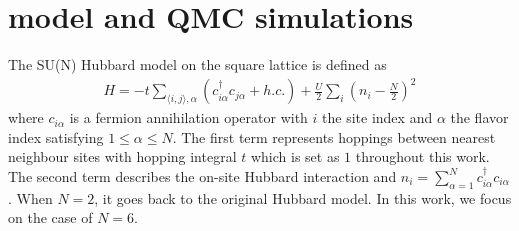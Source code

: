 \documentclass[twocolumn,superscriptaddress,prb]{revtex4-1}
\begin{document}




\section{model and QMC simulations}
The SU(N) Hubbard model on the square lattice is defined as
\begin{eqnarray}
  H=-t\sum_{\langle i,j\rangle,\alpha}\left(c_{i\alpha}^\dag c_{j\alpha}
  +h.c.\right)+\frac{U}{2}\sum_{i}\left(n_i-\frac{N}{2}\right)^2
  \label{eq:hamilton}
\end{eqnarray}
where $c_{i\alpha}$ is a fermion annihilation operator with $i$ the site index and $\alpha$ the flavor index satisfying $1\le\alpha\le N$. The first term represents hoppings between nearest neighbour sites with hopping integral $t$ which is set as $1$ throughout this work. The second term describes the on-site Hubbard interaction and $n_i=\sum_{\alpha=1}^{N} c_{i\alpha}^\dag c_{i\alpha}$. When $N=2$, it goes back to the original Hubbard model. In this work, we focus on the case of $N=6$. 
\end{document}

